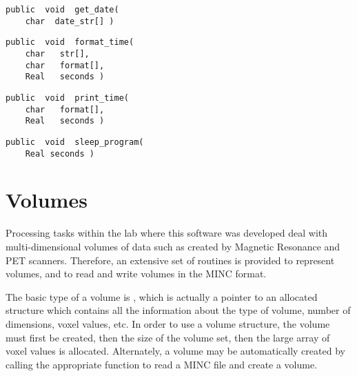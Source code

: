 {\bf\begin{verbatim}
public  void  get_date(
    char  date_str[] )
\end{verbatim}}


{\bf\begin{verbatim}
public  void  format_time(
    char   str[],
    char   format[],
    Real   seconds )
\end{verbatim}}


{\bf\begin{verbatim}
public  void  print_time(
    char   format[],
    Real   seconds )
\end{verbatim}}


{\bf\begin{verbatim}
public  void  sleep_program(
    Real seconds )
\end{verbatim}}


\chapter{Volumes}

Processing tasks within the lab where this software was developed
deal with multi-dimensional volumes of data such as created by
Magnetic Resonance and PET scanners.  Therefore, an extensive set of
routines is provided to represent volumes, and to read and write
volumes in the MINC format.

The basic type of a volume is , which is actually a
pointer to an allocated structure which contains all the information
about the type of volume, number of dimensions, voxel values, etc.  In
order to use a volume structure, the volume must first be created, then
the size of the volume set, then the large array of voxel values is
allocated.  Alternately, a volume may be automatically created by
calling the appropriate function to read a MINC file and create a
volume.

